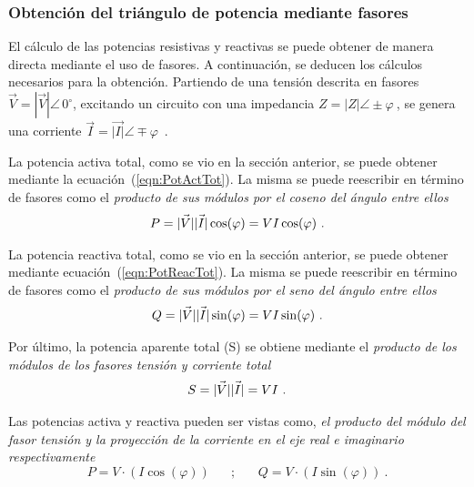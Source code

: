          \subsubsection{Obtención del triángulo de potencia mediante fasores}
            El cálculo de las potencias resistivas y reactivas se puede obtener de manera
            directa mediante el uso de fasores. A continuación, se deducen los cálculos
            necesarios para la obtención.
            Partiendo de una tensión descrita en fasores $\vec{V} = |\vec{V}| \angle \,  0^{\circ} $,
            excitando un circuito con una impedancia $ Z = |Z| \angle \pm \varphi \ $, se
            genera una corriente $\vec{I}  = \vec{|I|} \angle \mp   \varphi $~.

            La potencia activa total, como se vio en la sección anterior, se puede obtener 
            mediante la ecuación~(\ref{eqn:PotActTot}). La misma se puede reescribir en término de 
            fasores como el \textit{producto de sus módulos por el coseno del ángulo entre ellos}
               \begin{align}
                  P = \vec{|V|} \vec{|I|} \cos(\varphi) = V I \cos(\varphi)~. \notag
               \end{align}   

            \noindent La potencia reactiva total, como se vio en la sección anterior, se puede obtener 
            mediante ecuación~(\ref{eqn:PotReacTot}). La misma se puede reescribir en término de 
            fasores como el \textit{producto de sus módulos por el seno del ángulo entre ellos}
               \begin{align}
                  Q = \vec{|V|} \vec{|I|} \sin(\varphi) = V I \sin(\varphi)~. \notag
               \end{align}               
            
             \noindent Por último, la potencia aparente total (S) se obtiene mediante el 
            \textit{producto de los módulos de los fasores tensión y corriente total}  
               \begin{align}
                  S = \vec{|V|} \vec{|I|} = V I~. \notag
               \end{align}
            
               
             Las potencias activa y reactiva pueden ser vistas como, \textit{
            el producto del módulo del fasor tensión y la proyección de la corriente en 
            el eje real e imaginario respectivamente}
               \begin{equation*}
                  P  = V \cdot(I \cos(\varphi)) \hspace{20pt} ;
                  \hspace{20pt} Q  = V \cdot(I \sin(\varphi))~.
               \end{equation*}   

